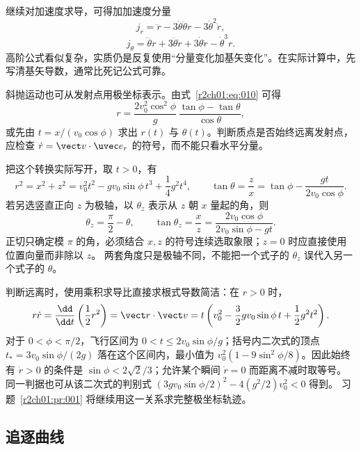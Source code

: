 继续对加速度求导，可得加加速度分量
\[
  j_r=\dddot r-3\dot\theta\ddot\theta r-3\dot\theta^2\dot r,
\]
\[
  j_\theta=\dddot\theta r+3\ddot\theta\dot r
  +3\dot\theta\ddot r-\dot\theta^3r.
\]
高阶公式看似复杂，实质仍是反复使用“分量变化加基矢变化”。在实际计算中，先写清基矢导数，通常比死记公式可靠。

斜抛运动也可从发射点用极坐标表示。由式~\eqref{r2ch01:eq:010} 可得
\begin{equation}
  r=\frac{2v_0^2\cos^2\phi}{g}\,
  \frac{\tan\phi-\tan\theta}{\cos\theta},
  \label{r2ch01:eq:017}
\end{equation}
或先由 $t=x/(v_0\cos\phi)$ 求出 $r(t)$ 与 $\theta(t)$。判断质点是否始终远离发射点，应检查 $\dot r=\vect v\cdot\uvec e_r$ 的符号，而不能只看水平分量。

把这个转换实际写开，取 $t>0$，有
\[
 r^2=x^2+z^2=v_0^2t^2-gv_0\sin\phi\,t^3+\frac14g^2t^4,
 \qquad \tan\theta=\frac{z}{x}=\tan\phi-\frac{gt}{2v_0\cos\phi}.
\]
若另选竖直正向 $z$ 为极轴，以 $\theta_z$ 表示从 $z$ 朝 $x$ 量起的角，则
\[
 \theta_z=\frac\pi2-\theta,\qquad
 \tan\theta_z=\frac{x}{z}=\frac{2v_0\cos\phi}{2v_0\sin\phi-gt}.
\]
正切只确定模 $\pi$ 的角，必须结合 $x,z$ 的符号连续选取象限；$z=0$ 时应直接使用位置向量而非除以 $z$。
两套角度只是极轴不同，不能把一个式子的 $\theta_z$ 误代入另一个式子的 $\theta$。

判断远离时，使用乘积求导比直接求根式导数简洁：在 $r>0$ 时，
\[
 r\dot r=\frac{\dd}{\dd t}\left(\frac12r^2\right)
 =\vect r\cdot\vect v
 =t\left(v_0^2-\frac32gv_0\sin\phi\,t+\frac12g^2t^2\right).
\]
对于 $0<\phi<\pi/2$，飞行区间为 $0<t\leq2v_0\sin\phi/g$；括号内二次式的顶点
$t_*=3v_0\sin\phi/(2g)$ 落在这个区间内，最小值为
$v_0^2(1-9\sin^2\phi/8)$。因此始终有 $\dot r>0$ 的条件是
$\sin\phi<2\sqrt2/3$；允许某个瞬间 $\dot r=0$ 而距离不减时取等号。
同一判据也可从该二次式的判别式
$(3gv_0\sin\phi/2)^2-4(g^2/2)v_0^2<0$ 得到。
习题~\ref{r2ch01:pr:001} 将继续用这一关系求完整极坐标轨迹。

\clearpage
\subsection{追逐曲线}
\label{r2ch01:sec:pursuit}


